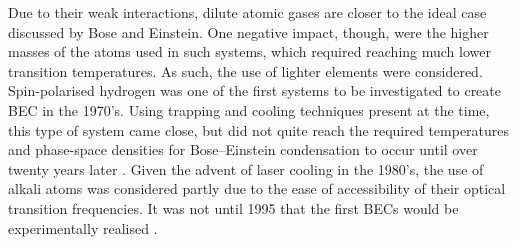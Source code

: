Due to their weak interactions, dilute atomic gases are closer to the ideal case discussed by Bose and Einstein. One negative impact, though, were the higher masses of the atoms used in such systems, which required reaching much lower transition temperatures. As such, the use of lighter elements were considered. Spin-polarised hydrogen
was one of the first systems to be investigated to create BEC \cite{BEC:Kleppner_enfe_1998,BK:Pitaevskii_Stringari_2003} in the 1970's. Using trapping and cooling techniques
present at the time, this type of system came close, but did not quite reach the required temperatures and phase-space densities for
Bose--Einstein condensation to occur until over twenty years later \cite{BEC:Fried_prl_1998}. Given the advent of laser cooling in the 1980's, the use of alkali atoms was considered partly due to the ease of accessibility of their optical transition frequencies. It was not until 1995 that the first BECs would be experimentally realised \cite{BEC:Cornell_science_1995,BEC:Ketterle_prl_1995}.

